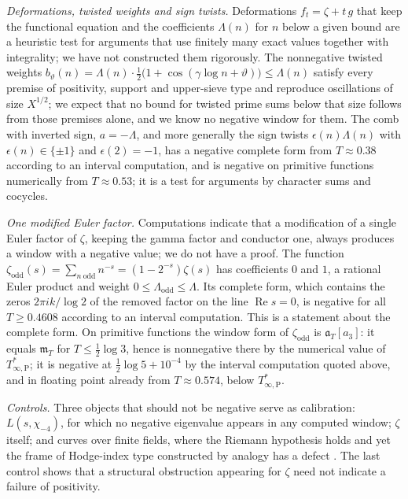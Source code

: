 \documentclass[11pt]{amsart}
\theoremstyle{definition}
\theoremstyle{remark}
\numberwithin{equation}{section}
\DeclareMathOperator{\Rel}{Re}
\newcommand{\mT}{\mathfrak{m}_T}                       %
\newcommand{\aT}{\mathfrak{a}_T}                       %
\newcommand{\Tarch}{T^{*}_{\infty,\mathrm P}}          %
\begin{document}
\emph{Deformations, twisted weights and sign twists.} Deformations $f_t=\zeta+t\,g$ that keep the functional
equation and the coefficients $\Lambda(n)$ for $n$ below a given bound are a heuristic test for arguments that use
finitely many exact values together with integrality; we have not constructed them rigorously. The nonnegative
twisted weights $b_\vartheta(n)=\Lambda(n)\cdot\frac12\big(1+\cos(\gamma\log n+\vartheta)\big)\le\Lambda(n)$
satisfy every premise of positivity, support and upper-sieve type and reproduce oscillations of size $X^{1/2}$; we
expect that no bound for twisted prime sums below that size follows from those premises alone, and we know no
negative window for them. The comb with inverted sign, $a=-\Lambda$, and more generally the sign twists
$\epsilon(n)\Lambda(n)$ with $\epsilon(n)\in\{\pm1\}$ and $\epsilon(2)=-1$, has a negative complete form from
$T\approx0.38$ according to an interval computation, and is negative on primitive functions numerically from
$T\approx0.53$; it is a test for arguments by character sums and cocycles.

\emph{One modified Euler factor.} Computations indicate that a modification of a single Euler factor
of $\zeta$, keeping the gamma factor and conductor one, always produces a window with a negative value; we do not
have a proof. The function
$\zeta_{\mathrm{odd}}(s)=\sum_{n\ \mathrm{odd}}n^{-s}=(1-2^{-s})\zeta(s)$ has coefficients $0$ and $1$, a
rational Euler product and weight $0\le\Lambda_{\mathrm{odd}}\le\Lambda$. Its complete form, which contains the
zeros $2\pi ik/\log2$ of the removed factor on the line $\Rel s=0$, is negative for all $T\ge0.4608$ according to an
interval computation. This is a statement about the complete form. On primitive functions the window form of
$\zeta_{\mathrm{odd}}$ is $\aT[a_3]$: it equals $\mT$ for $T\le\frac12\log3$, hence is nonnegative there by the
numerical value of $\Tarch$; it is negative at $\frac12\log5+10^{-4}$ by the interval computation quoted above, and
in floating point already from $T\approx0.574$, below $\Tarch$.

\emph{Controls.} Three objects that should not be negative serve as calibration: $L(s,\chi_{-4})$, for which no
negative eigenvalue appears in any computed window; $\zeta$ itself; and curves over finite fields, where the Riemann
hypothesis holds and yet the frame of Hodge-index type constructed by analogy has a defect
\cite[Theorem~10.8]{P47}. The last control shows that a structural obstruction appearing for $\zeta$ need not
indicate a failure of positivity.
\end{document}
